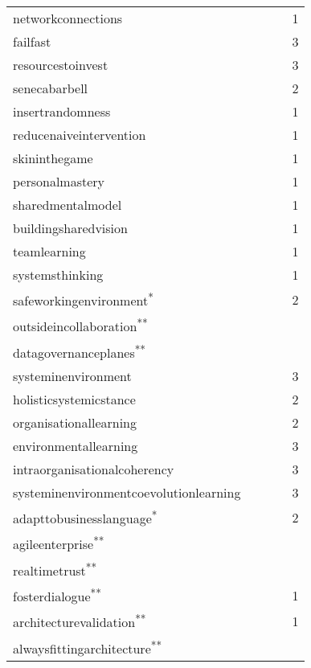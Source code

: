 {\begin{longtable}{@{}lllll@{}}
	\Gls{networkconnections} & \checkmark & & & 1 \\%
	\Gls{failfast} & \checkmark & \checkmark & \checkmark & 3 \\%
	\Gls{resourcestoinvest} & \checkmark & \checkmark & \checkmark & 3 \\%
	\Gls{senecabarbell} & \checkmark & \checkmark &  & 2 \\%
	\Gls{insertrandomness} & \checkmark & &  & 1 \\%
	\Gls{reducenaiveintervention} & \checkmark & & & 1 \\%
	\Gls{skininthegame} & \checkmark & & & 1 \\%
	\Gls{personalmastery} & \checkmark & & & 1 \\%
	\Gls{sharedmentalmodel} & \checkmark & & & 1 \\%
	\Gls{buildingsharedvision} & \checkmark & & & 1 \\%
	\Gls{teamlearning} & \checkmark & & & 1 \\%
	\Gls{systemsthinking} & \checkmark & & & 1 \\%
	\Gls{safeworkingenvironment}\textsuperscript{*} & & \checkmark & \checkmark & 2 \\%
	\Gls{outsideincollaboration}\textsuperscript{**} & & & & \\%
	\Gls{datagovernanceplanes}\textsuperscript{**} & & & & \\%
	\Gls{systeminenvironment}  & \checkmark & \checkmark & \checkmark & 3 \\%
	\Gls{holisticsystemicstance} & \checkmark & \checkmark &  & 2 \\%
	\Gls{organisationallearning} & \checkmark & \checkmark &  & 2 \\%
	\Gls{environmentallearning} & \checkmark & \checkmark & \checkmark & 3 \\%
	\Gls{intraorganisationalcoherency} & \checkmark & \checkmark & \checkmark & 3 \\%
	\Gls{systeminenvironmentcoevolutionlearning} & \checkmark & \checkmark & \checkmark & 3 \\%
	\Gls{adapttobusinesslanguage}\textsuperscript{*}  & & \checkmark & \checkmark & 2 \\%
	\Gls{agileenterprise}\textsuperscript{**} & & & & \\%
	\Gls{realtimetrust}\textsuperscript{**} & & & & \\%
	\Gls{fosterdialogue}\textsuperscript{**} & & & \checkmark & 1 \\%
	\Gls{architecturevalidation}\textsuperscript{**} & & & \checkmark & 1 \\%
	\Gls{alwaysfittingarchitecture}\textsuperscript{**} & & & & \\%
	\bottomrule%
\end{longtable}%
}%
